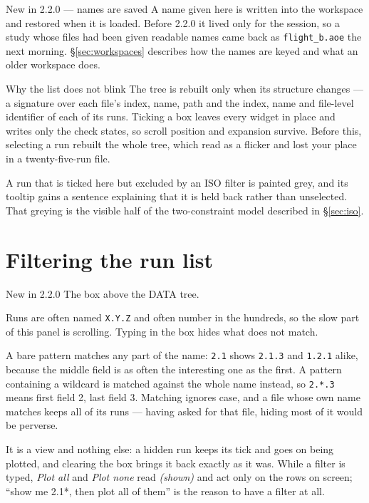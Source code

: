 \documentclass[11pt,a4paper,oneside]{report}
\newcommand{\appver}{2.2.0}
\newcommand{\code}[1]{\texttt{#1}}
\begin{document}
\begin{aoenew}{New in \appver{} --- names are saved}
A name given here is written into the workspace and restored when it is loaded.
Before \appver{} it lived only for the session, so a study whose files had been
given readable names came back as \code{flight\_b.aoe} the next morning.
\S\ref{sec:workspaces} describes how the names are keyed and what an older
workspace does.
\end{aoenew}

\begin{aoenote}{Why the list does not blink}
The tree is rebuilt only when its structure changes --- a signature over each
file's index, name, path and the index, name and file-level identifier of each of
its runs. Ticking a box leaves every widget in place and writes only the check
states, so scroll position and expansion survive. Before this, selecting a run
rebuilt the whole tree, which read as a flicker and lost your place in a
twenty-five-run file.
\end{aoenote}

A run that is ticked here but excluded by an ISO filter is painted grey, and its
tooltip gains a sentence explaining that it is held back rather than unselected.
That greying is the visible half of the two-constraint model described in
\S\ref{sec:iso}.

\section{Filtering the run list}

\begin{aoenew}{New in 2.2.0}
The box above the DATA tree.
\end{aoenew}

Runs are often named \code{X.Y.Z} and often number in the hundreds, so the slow
part of this panel is scrolling. Typing in the box hides what does not match.

A bare pattern matches any part of the name: \code{2.1} shows \code{2.1.3} and
\code{1.2.1} alike, because the middle field is as often the interesting one as
the first. A pattern containing a wildcard is matched against the whole name
instead, so \code{2.*.3} means first field 2, last field 3. Matching ignores
case, and a file whose own name matches keeps all of its runs --- having asked
for that file, hiding most of it would be perverse.

It is a view and nothing else: a hidden run keeps its tick and goes on being
plotted, and clearing the box brings it back exactly as it was. While a filter
is typed, \emph{Plot all} and \emph{Plot none} read \emph{(shown)} and act only
on the rows on screen; ``show me 2.1*, then plot all of them'' is the reason to
have a filter at all.
\end{document}
